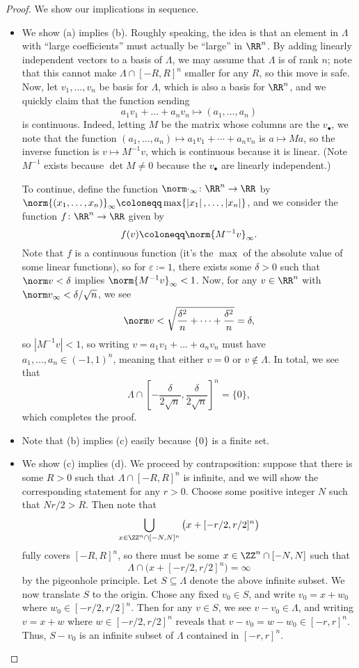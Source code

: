 \documentclass[../notes.tex]{subfiles}
\begin{document}
\begin{proof}
	We show our implications in sequence.
	\begin{itemize}
		\item We show (a) implies (b). Roughly speaking, the idea is that an element in $\Lambda$ with ``large coefficients'' must actually be ``large'' in $\RR^n$. By adding linearly independent vectors to a basis of $\Lambda$, we may assume that $\Lambda$ is of rank $n$; note that this cannot make $\Lambda\cap[-R,R]^n$ smaller for any $R$, so this move is safe. Now, let $v_1,\ldots,v_n$ be basis for $\Lambda$, which is also a basis for $\RR^n$, and we quickly claim that the function sending
		\[a_1v_1+\ldots+a_nv_n\mapsto(a_1,\ldots,a_n)\]
		is continuous. Indeed, letting $M$ be the matrix whose columns are the $v_\bullet$, we note that the function $(a_1,\ldots,a_n)\mapsto a_1v_1+\cdots+a_nv_n$ is $a\mapsto Ma$, so the inverse function is $v\mapsto M^{-1}v$, which is continuous because it is linear. (Note $M^{-1}$ exists because $\det M\ne0$ because the $v_\bullet$ are linearly independent.)
		
		To continue, define the function $\norm\cdot_\infty\colon\RR^n\to\RR$ by $\norm{(x_1,\ldots,x_n)}_\infty\coloneqq\max\{\left|x_1\right|,\ldots,\left|x_n\right|\}$, and we consider the function $f\colon\RR^n\to\RR$ given by
		\[f(v)\coloneqq\norm{M^{-1}v}_\infty.\]
		Note that $f$ is a continuous function (it's the $\max$ of the absolute value of some linear functions), so for $\varepsilon\coloneqq1$, there exists some $\delta>0$ such that $\norm v<\delta$ implies $\norm{M^{-1}v}_\infty<1$. Now, for any $v\in\RR^n$ with $\norm v_\infty<\delta/\sqrt n$, we see
		\[\norm v<\sqrt{\frac{\delta^2}n+\cdots+\frac{\delta^2}n}=\delta,\]
		so $\left|M^{-1}v\right|<1$, so writing $v=a_1v_1+\ldots+a_nv_n$ must have $a_1,\ldots,a_n\in(-1,1)^n$, meaning that either $v=0$ or $v\notin\Lambda$. In total, we see that
		\[\Lambda\cap\left[-\frac\delta{2\sqrt n},\frac\delta{2\sqrt n}\right]^n=\{0\},\]
		which completes the proof.

		\item Note that (b) implies (c) easily because $\{0\}$ is a finite set.

		\item We show (c) implies (d). We proceed by contraposition: suppose that there is some $R>0$ such that $\Lambda\cap[-R,R]^n$ is infinite, and we will show the corresponding statement for any $r>0$. Choose some positive integer $N$ such that $Nr/2>R$. Then note that
		\[\bigcup_{x\in\ZZ^n\cap[-N,N]^n}\big(x+[-r/2,r/2]^n\big)\]
		fully covers $[-R,R]^n$, so there must be some $x\in\ZZ^n\cap[-N,N]$ such that
		\[\Lambda\cap\big(x+[-r/2,r/2]^n\big)=\infty\]
		by the pigeonhole principle. Let $S\subseteq\Lambda$ denote the above infinite subset. We now translate $S$ to the origin. Chose any fixed $v_0\in S$, and write $v_0=x+w_0$ where $w_0\in[-r/2,r/2]^n$. Then for any $v\in S$, we see $v-v_0\in\Lambda$, and writing $v=x+w$ where $w\in[-r/2,r/2]^n$ reveals that $v-v_0=w-w_0\in[-r,r]^n$. Thus, $S-v_0$ is an infinite subset of $\Lambda$ contained in $[-r,r]^n$.


\end{itemize}
\end{proof}
\end{document}
